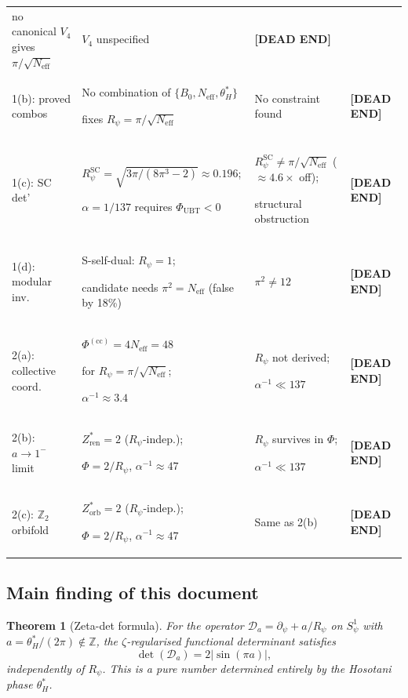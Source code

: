 \documentclass[11pt,a4paper]{article}
\newtheorem{theorem}{Theorem}
\theoremstyle{definition}
\theoremstyle{remark}
\begin{document}
\begin{center}
\begin{tabular}{lp{4.8cm}p{3.6cm}l}
      no canonical $V_4$ gives $\pi/\sqrt{N_{\mathrm{eff}}}$
    & $V_4$ unspecified
    & \textbf{[DEAD END]} \\[6pt]
  1(b): proved combos
    & No combination of $\{B_0,N_{\mathrm{eff}},\theta_H^*\}$\par
      fixes $R_\psi = \pi/\sqrt{N_{\mathrm{eff}}}$
    & No constraint found
    & \textbf{[DEAD END]} \\[6pt]
  1(c): SC det'
    & $R_\psi^{\mathrm{SC}} = \sqrt{3\pi/(8\pi^3-2)} \approx 0.196$;\par
      $\alpha=1/137$ requires $\Phi_{\mathrm{UBT}}<0$
    & $R_\psi^{\mathrm{SC}} \neq \pi/\sqrt{N_{\mathrm{eff}}}$ ($\approx 4.6\times$ off);\par
      structural obstruction
    & \textbf{[DEAD END]} \\[6pt]
  1(d): modular inv.
    & S-self-dual: $R_\psi = 1$;\par
      candidate needs $\pi^2 = N_{\mathrm{eff}}$ (false by 18\%)
    & $\pi^2 \neq 12$
    & \textbf{[DEAD END]} \\[6pt]
  2(a): collective coord.
    & $\Phi^{(\mathrm{cc})} = 4N_{\mathrm{eff}} = 48$\par
      for $R_\psi = \pi/\sqrt{N_{\mathrm{eff}}}$;\par
      $\alpha^{-1} \approx 3.4$
    & $R_\psi$ not derived;\par
      $\alpha^{-1} \ll 137$
    & \textbf{[DEAD END]} \\[6pt]
  2(b): $a\!\to\!1^-$ limit
    & $Z^*_{\mathrm{ren}} = 2$ ($R_\psi$-indep.);\par
      $\Phi = 2/R_\psi$, $\alpha^{-1} \approx 47$
    & $R_\psi$ survives in $\Phi$;\par
      $\alpha^{-1} \ll 137$
    & \textbf{[DEAD END]} \\[6pt]
  2(c): $\mathbb{Z}_2$ orbifold
    & $Z^*_{\mathrm{orb}} = 2$ ($R_\psi$-indep.);\par
      $\Phi = 2/R_\psi$, $\alpha^{-1} \approx 47$
    & Same as 2(b)
    & \textbf{[DEAD END]} \\
  \bottomrule
\end{tabular}
\end{center}

\subsection*{Main finding of this document}

\begin{theorem}[Zeta-det formula]
  For the operator $\mathcal{D}_a = \partial_\psi + a/R_\psi$ on
  $S^1_\psi$ with $a = \theta_H^*/(2\pi)\notin\mathbb{Z}$,
  the $\zeta$-regularised functional determinant satisfies
  \begin{equation}
    \det(\mathcal{D}_a) = 2\lvert\sin(\pi a)\rvert,
    \label{eq:thm_zeta}
  \end{equation}
  independently of $R_\psi$.
  This is a pure number determined entirely by the Hosotani phase
  $\theta_H^*$.
\end{theorem}
\end{document}
